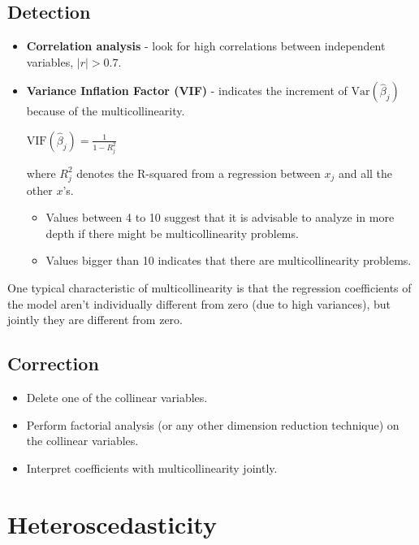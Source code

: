 \documentclass[10pt, a4paper, landscape]{extarticle}
\newcommand{\Var}{\mathrm{Var}}
\begin{document}
\begin{multicols}{3}
\subsection*{Detection}

\begin{itemize}[leftmargin=*]
	\item \textbf{Correlation analysis} - look for high correlations between independent variables, $\lvert r \rvert > 0.7$.
	\item \textbf{Variance Inflation Factor (VIF)} - indicates the increment of $\Var(\hat{\beta}_j)$ because of the multicollinearity.
	\begin{center}
		$\mathrm{VIF} (\hat{\beta}_j) = \frac{1}{1 - R_j^2}$
	\end{center}
	where $R^2_j$ denotes the R-squared from a regression between $x_j$ and all the other $x$'s. 
	\begin{itemize}[leftmargin=*]
		\item Values between 4 to 10 suggest that it is advisable to analyze in more depth if there might be multicollinearity problems.
		\item Values bigger than 10 indicates that there are multicollinearity problems.
	\end{itemize}
\end{itemize}

One typical characteristic of multicollinearity is that the regression coefficients of the model aren't individually different from zero (due to high variances), but jointly they are different from zero.

\subsection*{Correction}

\begin{itemize}[leftmargin=*]
	\item Delete one of the collinear variables.
	\item Perform factorial analysis (or any other dimension reduction technique) on the collinear variables.
	\item Interpret coefficients with multicollinearity jointly.
\end{itemize}

\columnbreak

\section*{Heteroscedasticity}


\end{multicols}
\end{document}

